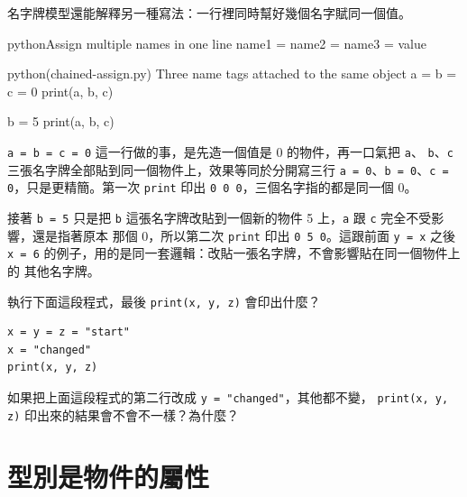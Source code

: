 
名字牌模型還能解釋另一種寫法：一行裡同時幫好幾個名字賦同一個值。

\begin{code}{python}{Assign multiple names in one line}
name1 = name2 = name3 = value
\end{code}

\begin{example}{python}{(chained-assign.py) Three name tags attached to the same object}
a = b = c = 0
print(a, b, c)

b = 5
print(a, b, c)
\end{example}


\texttt{a = b = c = 0} 這一行做的事，是先造一個值是 0 的物件，再一口氣把 \texttt{a}、
\texttt{b}、\texttt{c} 三張名字牌全部貼到同一個物件上，效果等同於分開寫三行
\texttt{a = 0}、\texttt{b = 0}、\texttt{c = 0}，只是更精簡。第一次 \texttt{print}
印出 \texttt{0 0 0}，三個名字指的都是同一個 0。

接著 \texttt{b = 5} 只是把 \texttt{b}
這張名字牌改貼到一個新的物件 5 上，\texttt{a} 跟 \texttt{c} 完全不受影響，還是指著原本
那個 0，所以第二次 \texttt{print} 印出 \texttt{0 5 0}。這跟前面 \texttt{y = x} 之後
\texttt{x = 6} 的例子，用的是同一套邏輯：改貼一張名字牌，不會影響貼在同一個物件上的
其他名字牌。

\begin{drills}[label=drills:name-tags-chained]
\item 執行下面這段程式，最後 \texttt{print(x, y, z)} 會印出什麼？
\begin{verbatim}
x = y = z = "start"
x = "changed"
print(x, y, z)
\end{verbatim}
\item 如果把上面這段程式的第二行改成 \texttt{y = "changed"}，其他都不變，
\texttt{print(x, y, z)} 印出來的結果會不會不一樣？為什麼？
\end{drills}

\section{型別是物件的屬性}
\label{sec:type-on-value}

